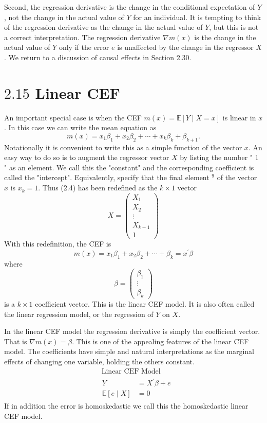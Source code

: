 \documentclass[10pt]{article}
\begin{document}
Second, the regression derivative is the change in the conditional expectation of $Y$, not the change in the actual value of $Y$ for an individual. It is tempting to think of the regression derivative as the change in the actual value of $Y$, but this is not a correct interpretation. The regression derivative $\nabla m(x)$ is the change in the actual value of $Y$ only if the error $e$ is unaffected by the change in the regressor $X$. We return to a discussion of causal effects in Section 2.30.

\section{$2.15$ Linear CEF}
An important special case is when the CEF $m(x)=\mathbb{E}[Y \mid X=x]$ is linear in $x$. In this case we can write the mean equation as
$$
m(x)=x_{1} \beta_{1}+x_{2} \beta_{2}+\cdots+x_{k} \beta_{k}+\beta_{k+1} .
$$
Notationally it is convenient to write this as a simple function of the vector $x$. An easy way to do so is to augment the regressor vector $X$ by listing the number " 1 " as an element. We call this the "constant" and the corresponding coefficient is called the "intercept". Equivalently, specify that the final element ${ }^{9}$ of the vector $x$ is $x_{k}=1$. Thus (2.4) has been redefined as the $k \times 1$ vector
$$
X=\left(\begin{array}{c}
X_{1} \\
X_{2} \\
\vdots \\
X_{k-1} \\
1
\end{array}\right)
$$
With this redefinition, the CEF is
$$
m(x)=x_{1} \beta_{1}+x_{2} \beta_{2}+\cdots+\beta_{k}=x^{\prime} \beta
$$
where
$$
\beta=\left(\begin{array}{c}
\beta_{1} \\
\vdots \\
\beta_{k}
\end{array}\right)
$$
is a $k \times 1$ coefficient vector. This is the linear CEF model. It is also often called the linear regression model, or the regression of $Y$ on $X$.

In the linear CEF model the regression derivative is simply the coefficient vector. That is $\nabla m(x)=\beta$. This is one of the appealing features of the linear CEF model. The coefficients have simple and natural interpretations as the marginal effects of changing one variable, holding the others constant.
$$
\begin{aligned}
&\text { Linear CEF Model } \\
&\begin{aligned}
Y &=X^{\prime} \beta+e \\
\mathbb{E}[e \mid X] &=0
\end{aligned}
\end{aligned}
$$
If in addition the error is homoskedastic we call this the homoskedastic linear CEF model.
\end{document}
